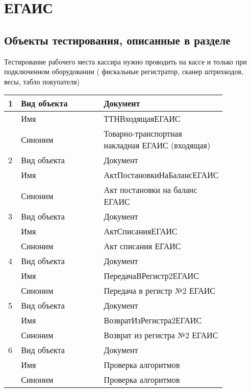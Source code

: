 \section{ЕГАИС}
\subsection{Объекты тестирования, описанные в разделе}

Тестирование рабочего места кассира нужно проводить на кассе и только при подключенном оборудовании ( фискальные регистратор, сканер штрихкодов, весы, табло покупателя)
\begin{longtable}{p{0.05\linewidth}p{0.4\linewidth}p{0.4\linewidth}}

   	\hline
   	1 & Вид объекта  & Документ \\
   	\hline
   	& Имя & ТТНВходящаяЕГАИС \\
   	\hline
   	& Синоним  & Товарно-транспортная накладная ЕГАИС (входящая) \\
   	\hline
     2 & Вид объекта  & Документ \\
    \hline
    & Имя & АктПостановкиНаБалансЕГАИС \\
    \hline
    & Синоним  & Акт постановки на баланс ЕГАИС \\
    \hline
    3 & Вид объекта  & Документ \\
    \hline
    & Имя & АктСписанияЕГАИС \\
    \hline
    & Синоним  & Акт списания ЕГАИС \\
    \hline
    4 & Вид объекта  & Документ \\
    \hline
    & Имя & ПередачаВРегистр2ЕГАИС \\
    \hline
    & Синоним  & Передача в регистр №2 ЕГАИС \\
    \hline
    5 & Вид объекта  & Документ \\
    \hline
    & Имя & ВозвратИзРегистра2ЕГАИС \\
    \hline
    & Синоним  & Возврат из регистра №2 ЕГАИС \\
    \hline
     6 & Вид объекта & Документ \\
    \hline
    & Имя & Проверка алгоритмов \\
    \hline
    & Синоним  & Проверка алгоритмов \\
    \hline
    \bottomrule %
\end{longtable}
